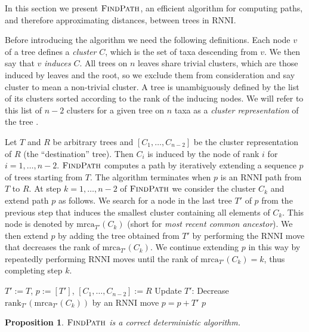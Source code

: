 \documentclass{amsart}
\newcommand{\mrca}{\mathrm{mrca}}
\newcommand{\rank}{\mathrm{rank}}
\newcommand{\rnni}{\mathrm{RNNI}}
\newcommand{\findpath}{\textsc{FindPath}}
\newtheorem{proposition}[definition]{Proposition}
\begin{document}
In this section we present $\findpath$, an efficient algorithm for computing paths, and therefore approximating distances, between trees in $\rnni$.

Before introducing the algorithm we need the following definitions.
Each node $v$ of a tree defines a \emph{cluster} $C$, which is the set of taxa descending from $v$.
We then say that $v$ \emph{induces} $C$.
All trees on $n$ leaves share trivial clusters, which are those induced by leaves and the root, so we exclude them from consideration and say cluster to mean a non-trivial cluster.
A tree is unambiguously defined by the list of its clusters sorted according to the rank of the inducing nodes.
We will refer to this list of $n-2$ clusters for a given tree on $n$ taxa as a \emph{cluster representation} of the tree \autocite{Gavryushkin2018-ol, Gavryushkin2016-uu, Semple2003-nj}.

Let $T$ and $R$ be arbitrary trees and $[C_1, \ldots, C_{n-2}]$ be the cluster representation of $R$ (the ``destination'' tree).
Then $C_i$ is induced by the node of rank $i$ for $i = 1, \ldots, n-2$.
$\findpath$ computes a path by iteratively extending a sequence $p$ of trees starting from $T$.
The algorithm terminates when $p$ is an $\rnni$ path from $T$ to $R$.
At step $k = 1, \ldots, n-2$ of $\findpath$ we consider the cluster $C_k$ and extend path $p$ as follows.
We search for a node in the last tree $T'$ of $p$ from the previous step that induces the smallest cluster containing all elements of $C_k$.
This node is denoted by $\mrca_{T'}(C_k)$ (short for \emph{most recent common ancestor}).
We then extend $p$ by adding the tree obtained from $T'$ by performing the $\rnni$ move that decreases the rank of $\mrca_{T'}(C_k)$.
We continue extending $p$ in this way by repeatedly performing $\rnni$ moves until the rank of $\mrca_{T'}(C_k) = k$, thus completing step $k$.

\begin{algorithm}[H]
\caption{$\findpath$($T,R$)}
\begin{algorithmic}[1]
\STATE $T' := T$, $p := [T']$, $[C_1, \ldots, C_{n-2}] := R$
  \WHILE {$\rank_{T'}(\mrca_{T'}(C_k))>k$}
    \STATE Update $T'$: Decrease $\rank_{T'}(\mrca_{T'}(C_k))$ by an $\rnni$ move
    \label{alg:findpath:line:move_set_down}
    \STATE $p = p+T'$
  \ENDWHILE
\ENDFOR
\RETURN $p$
\end{algorithmic}
\end{algorithm}

\begin{proposition}
$\findpath$ is a correct deterministic algorithm.
\end{proposition}
\end{document}
